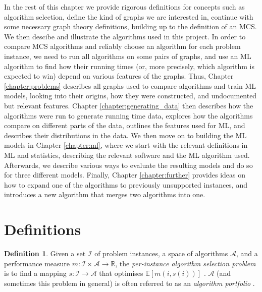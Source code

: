 \documentclass{l4proj}
\theoremstyle{definition}
\newtheorem{definition}{Definition}[chapter]
\theoremstyle{remark}
\begin{document}
In the rest of this chapter we provide rigorous definitions for concepts such as
algorithm selection, define the kind of graphs we are interested in, continue
with some necessary graph theory definitions, building up to the definition of
an MCS. We then descibe and illustrate the algorithms used in this project. In
order to compare MCS algorithms and reliably choose an algorithm for each
problem instance, we need to run all algorithms on some pairs of graphs, and
use an ML algorithm to find how their running times (or, more precisely, which
algorithm is expected to win) depend on various features of the graphs. Thus,
Chapter \ref{chapter:problems} describes all graphs used to compare algorithms
and train ML models, looking into their origins, how they were constructed, and
undocumented but relevant features. Chapter \ref{chapter:generating_data} then
describes how the algorithms were run to generate running time data, explores
how the algorithms compare on different parts of the data, outlines the features
used for ML, and describes their distributions in the data. We then move on to
building the ML models in Chapter \ref{chapter:ml}, where we start with the
relevant definitions in ML and statistics, describing the relevant software and
the ML algorithm used. Afterwards, we describe various ways to evaluate the
resulting models and do so for three different models. Finally, Chapter
\ref{chapter:further} provides ideas on how to expand one of the algorithms to
previously unsupported instances, and introduces a new algorithm that merges two
algorithms into one.

\section{Definitions} \label{sec:definitions}

\begin{definition}
  Given a set $\mathcal{I}$ of problem instances, a space of algorithms
  $\mathcal{A}$, and a performance measure $m \colon \mathcal{I} \times
  \mathcal{A} \to \mathbb{R}$, the \emph{per-instance algorithm selection
    problem} is to find a mapping $s \colon \mathcal{I} \to \mathcal{A}$ that
  optimises $\mathbb{E}[m(i, s(i))]$ \cite{DBLP:journals/ai/BischlKKLMFHHLT16}.
  $\mathcal{A}$ (and sometimes this problem in general) is often referred to as
  an \emph{algorithm portfolio} \cite{DBLP:conf/ijcai/Leyton-BrownNAMS03,
    DBLP:journals/corr/abs-1111-2249}.
\end{definition}
\end{document}
